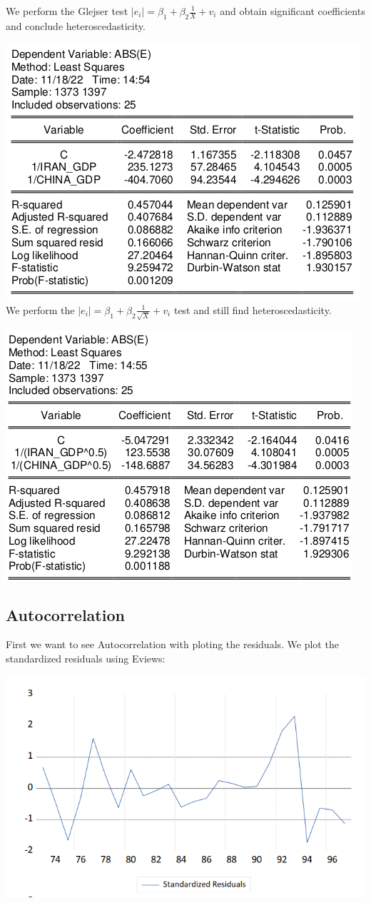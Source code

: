\documentclass[12pt, letterpaper, twoside]{article}
\begin{document}
We perform the Glejser test \(\left|e_{i}  \right|=\beta_{1}+\beta_{2}\frac{1}{X}+v_{i}\) and obtain significant coefficients and conclude heteroscedasticity.

        \includegraphics[width=.6\textwidth,height=.6\textwidth,keepaspectratio,center]{14.png}
We perform the \(\left|e_{i}  \right|=\beta_{1}+\beta_{2}\frac{1}{\sqrt{X}}+v_{i}\) test and still find heteroscedasticity.

        \includegraphics[width=.6\textwidth,height=.6\textwidth,keepaspectratio,center]{15.png}
\subsection{Autocorrelation}

First we want to see Autocorrelation with ploting the residuals. We plot the standardized residuals using Eviews:

        \includegraphics[width=.6\textwidth,height=.6\textwidth,keepaspectratio,center]{16.png}
        
\end{document}
